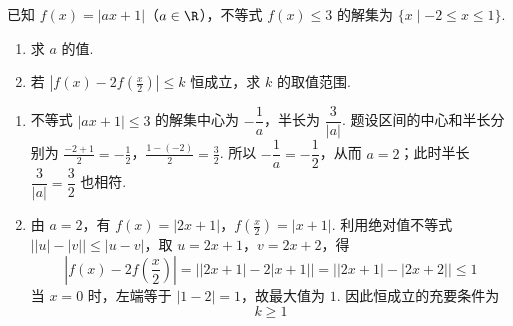 \begin{problem}
已知 \(f(x) = |ax + 1|\)（\(a \in \R\)），不等式 \(f(x) \leqslant 3\) 的解集为 \(\{x \mid -2 \leqslant x \leqslant 1\}\).

\begin{enumerate}
\item 求 \(a\) 的值.
\item 若 \(\left|f(x)-2f\left(\frac{x}{2}\right)\right|\leqslant k\) 恒成立，求 \(k\) 的取值范围.
\end{enumerate}
\end{problem}

\begin{solution}
\begin{enumerate}
\item 不等式 \(|ax+1|\leqslant3\) 的解集中心为 \(-\dfrac1a\)，半长为 \(\dfrac3{|a|}\). 题设区间的中心和半长分别为
\(\frac{-2+1}{2}=-\frac12\)，\(\frac{1-(-2)}2=\frac32\).
所以 \(-\dfrac1a=-\dfrac12\)，从而 \(a=2\)；此时半长 \(\dfrac3{|a|}=\dfrac32\) 也相符.
\item 由 \(a=2\)，有
\(f(x)=|2x+1|\)，\(f\left(\frac x2\right)=|x+1|\).
利用绝对值不等式 \(\bigl||u|-|v|\bigr|\leqslant|u-v|\)，取 \(u=2x+1\)，\(v=2x+2\)，得
\[
\left|f(x)-2f\left(\frac x2\right)\right|
=\bigl||2x+1|-2|x+1|\bigr|
=\bigl||2x+1|-|2x+2|\bigr|\leqslant1
\]
当 \(x=0\) 时，左端等于 \(|1-2|=1\)，故最大值为 \(1\). 因此恒成立的充要条件为
\[
k\geqslant1
\]
\end{enumerate}
\end{solution}
